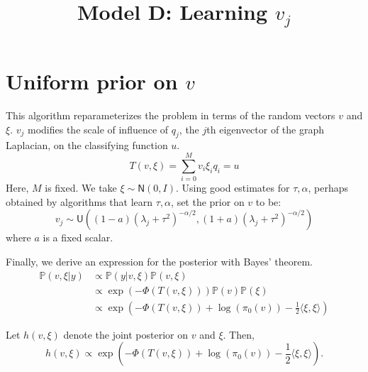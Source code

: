 \documentclass{siamart1116}
\title{Model D: Learning $v_j$}
\author{\TheAuthors}
\date{}
\begin{document}
\maketitle
\setlength{\unitlength}{1in}
\setlength{\parindent}{0in}
\section{Uniform prior on $v$}
    This algorithm reparameterizes the problem in terms of the random vectors $v$ and $\xi$. $v_j$ modifies the scale of influence of $q_j$, the $j$th eigenvector of the graph Laplacian, on the classifying function $u$.
    \begin{equation}
    \label{eqn:v_T}
    T(v,\xi) = \sum_{i=0}^{M} v_i\xi_iq_i = u
    \end{equation}
    Here, $M$ is fixed. We take $\xi \sim \mathsf{N}(0, I)$. Using good estimates for $\tau, \alpha$, perhaps obtained by algorithms that learn $\tau, \alpha$, set the prior on $v$ to be:
    \[v_j \sim \mathsf{U}\left((1-a)(\lambda_j+\tau^2)^{-\alpha/2},(1+a)(\lambda_j+\tau^2)^{-\alpha/2}\right)\]
    where $a$ is a fixed scalar.

    Finally, we derive an expression for the posterior with Bayes' theorem.
    \begin{align*}
    \mathbb{P}(v,\xi | y) &\propto \mathbb{P}(y|v, \xi) \mathbb{P}(v, \xi)\\
    &\propto \exp \left(-\Phi(T(v,\xi)) \right) \mathbb{P}(v)\mathbb{P}(\xi) \\
    &\propto \exp \left(-\Phi(T(v,\xi)) + \log (\pi_0(v)) - \frac{1}{2}\langle \xi, \xi \rangle  \right)
    \end{align*}

    Let $h(v,\xi)$ denote the joint posterior on $v$ and $\xi$. Then,
    \begin{equation}
    \label{eqn:learn_v_posterior}
    h(v, \xi) \propto \exp \left(-\Phi(T(v,\xi)) + \log (\pi_0(v)) - \frac{1}{2}\langle \xi, \xi \rangle  \right).
    \end{equation}
\end{document}
